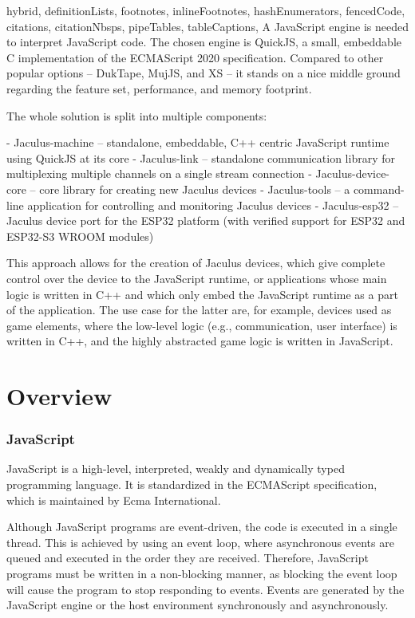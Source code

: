\documentclass[
  digital,
  oneside,
  nosansbold,
  nocolorbold,
  lof,
  lot
]{fithesis4}
\begin{document}
\begin{markdown*}{%
  hybrid,
  definitionLists,
  footnotes,
  inlineFootnotes,
  hashEnumerators,
  fencedCode,
  citations,
  citationNbsps,
  pipeTables,
  tableCaptions,
}
A JavaScript engine is needed to interpret JavaScript code. The chosen engine is QuickJS, a small, embeddable C implementation of the ECMAScript 2020 specification. Compared to other popular options -- DukTape, MujJS, and XS -- it stands on a nice middle ground regarding the feature set, performance, and memory footprint.

The whole solution is split into multiple components:

  - Jaculus-machine -- standalone, embeddable, C++ centric JavaScript runtime using QuickJS at its core
  - Jaculus-link -- standalone communication library for multiplexing multiple channels on a single stream connection
  - Jaculus-device-core -- core library for creating new Jaculus devices
  - Jaculus-tools -- a command-line application for controlling and monitoring Jaculus devices
  - Jaculus-esp32 -- Jaculus device port for the ESP32 platform (with verified support for ESP32 and ESP32-S3 WROOM modules)

This approach allows for the creation of Jaculus devices, which give complete control over the device to the JavaScript runtime, or applications whose main logic is written in C++ and which only embed the JavaScript runtime as a part of the application. The use case for the latter are, for example, devices used as game elements, where the low-level logic (e.g., communication, user interface) is written in C++, and the highly abstracted game logic is written in JavaScript.


\chapter{Overview}

\subsection{JavaScript}

JavaScript is a high-level, interpreted, weakly and dynamically typed programming language. It is standardized in the ECMAScript specification, which is maintained by Ecma International.

Although JavaScript programs are event-driven, the code is executed in a single thread. This is achieved by using an event loop, where asynchronous events are queued and executed in the order they are received. Therefore, JavaScript programs must be written in a non-blocking manner, as blocking the event loop will cause the program to stop responding to events. Events are generated by the JavaScript engine or the host environment synchronously and asynchronously.



\end{markdown*}
\end{document}

